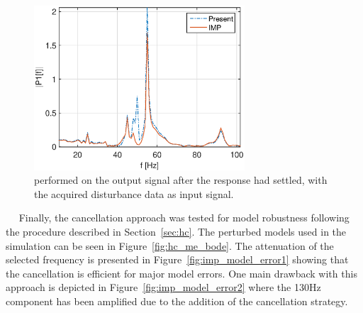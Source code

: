 \begin{figure}[h!]
  \centering
  \includegraphics[width=0.7\textwidth]{fig/matlab/distrej_realstep_fft.eps}
  \caption{\label{fig:imp_realdata} \abbrFFT performed on the output signal after the response had settled, with the acquired disturbance data as input signal.}
\end{figure}

\newpage~\newpage~
\FloatBarrier
Finally, the cancellation approach was tested for model robustness following the procedure described in Section~\ref{sec:hc}. The perturbed models used in the simulation can be seen in Figure~\ref{fig:hc_me_bode}. The attenuation of the selected frequency is presented in Figure~\ref{fig:imp_model_error1} showing that the cancellation is efficient for major model errors. One main drawback with this approach is depicted in Figure~\ref{fig:imp_model_error2} where the 130Hz component has been amplified due to the addition of the \abbrIMP cancellation strategy.



